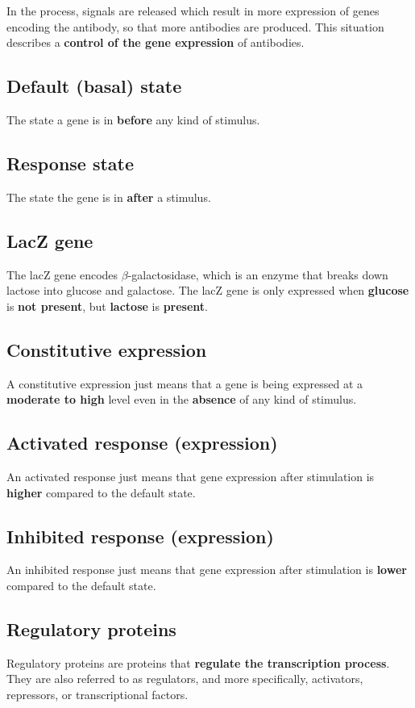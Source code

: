 \documentclass[11pt]{article}
\begin{document}
In the process, signals are released which result in more expression of genes encoding the antibody, so that more antibodies are produced. This situation describes a \textbf{control of the gene expression} of antibodies.
\subsection{Default (basal) state}
\label{sec:org1e79a10}
The state a gene is in \textbf{before} any kind of stimulus.
\subsection{Response state}
\label{sec:org24af2f4}
The state the gene is in \textbf{after} a stimulus.
\subsection{LacZ gene}
\label{sec:orgde5f952}
The lacZ gene encodes \(\beta\)-galactosidase, which is an enzyme that breaks down lactose into glucose and galactose. The lacZ gene is only expressed when \textbf{glucose} is \textbf{not present}, but \textbf{lactose} is \textbf{present}.
\subsection{Constitutive expression}
\label{sec:org114538a}
A constitutive expression just means that a gene is being expressed at a \textbf{moderate to high} level even in the \textbf{absence} of any kind of stimulus.
\subsection{Activated response (expression)}
\label{sec:org6b76589}
An activated response just means that gene expression after stimulation is \textbf{higher} compared to the default state.
\subsection{Inhibited response (expression)}
\label{sec:org8c2ac45}
An inhibited response just means that gene expression after stimulation is \textbf{lower} compared to the default state.
\subsection{Regulatory proteins}
\label{sec:org039ed98}
Regulatory proteins are proteins that \textbf{regulate the transcription process}. They are also referred to as regulators, and more specifically, activators, repressors, or transcriptional factors.
\end{document}
